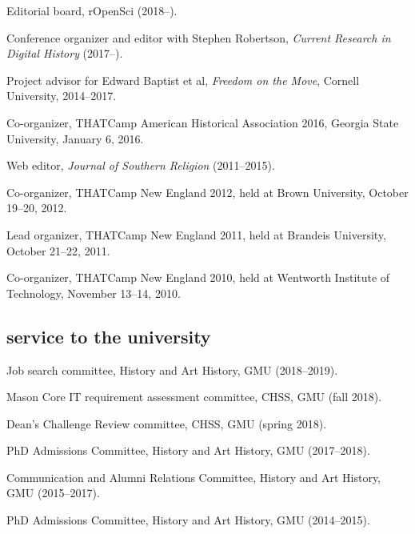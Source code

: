 \documentclass[11pt]{article}
\begin{document}
Editorial board, rOpenSci (2018--).

Conference organizer and editor with Stephen Robertson, \emph{Current Research 
  in Digital History} (2017--).

Project advisor for Edward Baptist et al, \emph{Freedom on the Move}, Cornell 
University, 2014--2017.

Co-organizer, THATCamp American Historical Association 2016, Georgia State University, January 6, 2016.

Web editor, \emph{Journal of Southern Religion} (2011--2015).

Co-organizer, THATCamp New England 2012, held at Brown University,
October 19--20, 2012.

Lead organizer, THATCamp New England 2011, held at Brandeis University,
October 21--22, 2011.

Co-organizer, THATCamp New England 2010, held at Wentworth Institute of
Technology, November 13--14, 2010.


\subsection{service to the university}\label{service-university}

Job search committee, History and Art History, GMU (2018--2019).

Mason Core IT requirement assessment committee, CHSS, GMU (fall 2018).

Dean's Challenge Review committee, CHSS, GMU (spring 2018).

PhD Admissions Committee, History and Art History, GMU (2017--2018).

Communication and Alumni Relations Committee, History and Art History, GMU 
(2015--2017).

PhD Admissions Committee, History and Art History, GMU (2014--2015).




\end{document}
